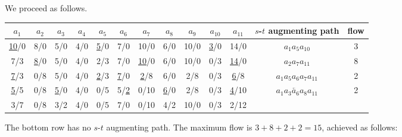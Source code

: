 We proceed as follows.
\begin{table}[H]
    \centering
    \begin{tabular}{|ccccccccccc|c|c|}
        \hline
        $a_1$ & $a_2$ & $a_3$ & $a_4$ & $a_5$ & $a_6$ & $a_7$ & $a_8$ & $a_9$ & $a_{10}$ & $a_{11}$ & $s$-$t$ augmenting path & flow  \\ \hline
        \uline{10}/0 & 8/0 & 5/0 & 4/0 & \uline{5}/0 & 7/0 & 10/0 & 6/0 & 10/0 & \uline{3}/0 & 14/0 & $a_1 a_5 a_{10}$ & 3 \\
        7/3 & \uline{8}/0 & 5/0 & 4/0 & 2/3 & 7/0 & \uline{10}/0 & 6/0 & 10/0 & 0/3 & \uline{14}/0 & $a_2 a_7 a_{11}$ & 8 \\
        \uline{7}/3 & 0/8 & 5/0 & 4/0 & \uline{2}/3 & \uline{7}/0 & \uline{2}/8 & 6/0 & 2/8 & 0/3 & \uline{6}/8 & $a_1 a_5 a_6 a_7 a_{11}$ & 2 \\
        \uline{5}/5 & 0/8 & \uline{5}/0 & 4/0 & 0/5 & 5/\uline{2} & 0/10 & \uline{6}/0 & 2/8 & 0/3 & \uline{4}/10 & $a_1 a_3 \overleftarrow{a_6} a_8 a_{11}$ & 2 \\
        3/7 & 0/8 & 3/2 & 4/0 & 0/5 & 7/0 & 0/10 & 4/2 & 10/0 & 0/3 & 2/12 & & \\ \hline
    \end{tabular}
\end{table}

The bottom row has no $s$-$t$ augmenting path. The maximum flow is $3+8+2+2 = 15$, achieved as follows:


